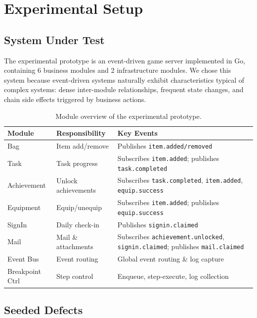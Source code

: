 \documentclass[sigconf,nonacm]{acmart}
\begin{document}
\section{Experimental Setup}

\subsection{System Under Test}

The experimental prototype is an event-driven game server implemented in Go, containing 6 business modules and 2 infrastructure modules. We chose this system because event-driven systems naturally exhibit characteristics typical of complex systems: dense inter-module relationships, frequent state changes, and chain side effects triggered by business actions.

\begin{table}[t]
\caption{Module overview of the experimental prototype.}
\label{tab:modules}
\small
\begin{tabular}{lll}
\toprule
Module & Responsibility & Key Events \\
\midrule
Bag & Item add/remove & Publishes \texttt{item.added/removed} \\
Task & Task progress & Subscribes \texttt{item.added}; publishes \texttt{task.completed} \\
Achievement & Unlock achievements & Subscribes \texttt{task.completed}, \texttt{item.added}, \texttt{equip.success} \\
Equipment & Equip/unequip & Subscribes \texttt{item.added}; publishes \texttt{equip.success} \\
SignIn & Daily check-in & Publishes \texttt{signin.claimed} \\
Mail & Mail \& attachments & Subscribes \texttt{achievement.unlocked}, \texttt{signin.claimed}; publishes \texttt{mail.claimed} \\
Event Bus & Event routing & Global event routing \& log capture \\
Breakpoint Ctrl & Step control & Enqueue, step-execute, log collection \\
\bottomrule
\end{tabular}
\end{table}

\subsection{Seeded Defects}
\end{document}
